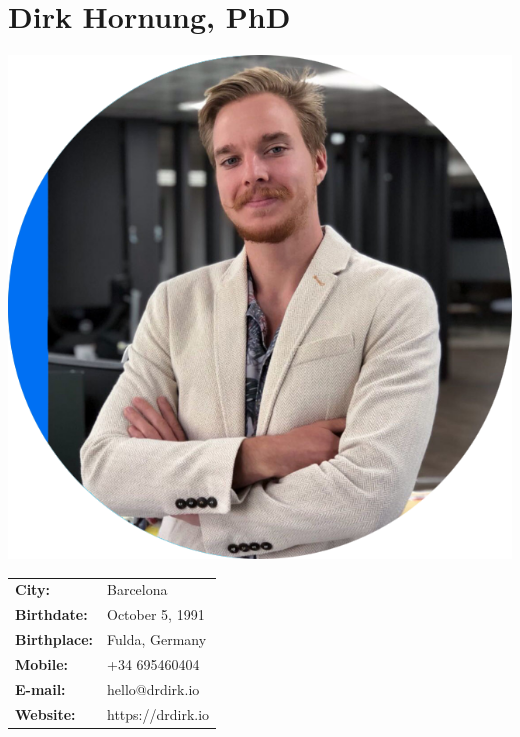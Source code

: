 \documentclass[11pt]{article}
\begin{document}
\begin{minipage}[t]{0.25\textwidth}
\section*{Dirk Hornung, PhD}

\vspace{0.8cm}

\includegraphics[width=\linewidth]{dirkRound.png}

\vspace{1.1cm}

\begin{footnotesize}
\begin{tabularx}{\linewidth}{@{}>{\bfseries}ll@{}}
City:       & Barcelona \\
Birthdate:  & October 5, 1991\\
Birthplace: & Fulda, Germany \\
Mobile:     & +34 695460404 \\
E-mail:     & hello@drdirk.io \\
Website:    & https://drdirk.io
\end{tabularx}
\end{footnotesize}

\vspace{0.5cm}

\small

\end{minipage}
\end{document}
